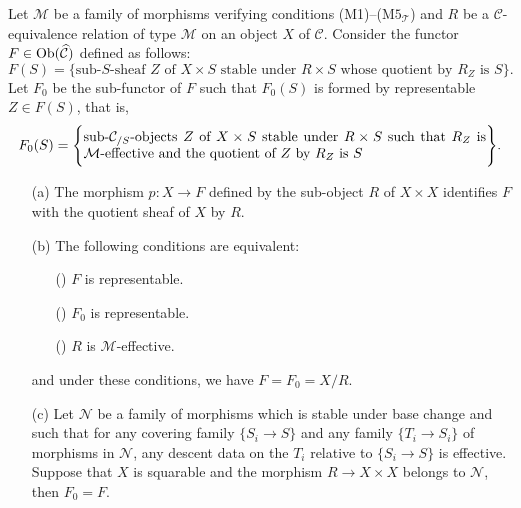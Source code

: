 \begin{theorem}\label{site sheaf quotient by M-effective char}
Let $\mathcal{M}$ be a family of morphisms verifying conditions (M1)--($\text{M5}_\mathcal{T}$) and $R$ be a $\mathcal{C}$-equivalence relation of type $\mathcal{M}$ on an object $X$ of $\mathcal{C}$. Consider the functor $F\in\mathrm{Ob}(\widehat{\mathcal{C}})$ defined as follows:
\[F(S)=\{\text{sub-$S$-sheaf $Z$ of $X\times S$ stable under $R\times S$ whose quotient by $R_Z$ is $S$}\}.\]
Let $F_0$ be the sub-functor of $F$ such that $F_0(S)$ is formed by representable $Z\in F(S)$, that is,
\[F_0(S)=\Bigg\{\parbox{4in}{%
sub-$\mathcal{C}_{/S}$-objects $Z$ of $X\times S$ stable under $R\times S$ such that $R_Z$ is $\mathcal{M}$-effective and the quotient of $Z$ by $R_Z$ is $S$%
}\Bigg\}.\]
\begin{enumerate}
    \item[(a)] The morphism $p:X\to F$ defined by the sub-object $R$ of $X\times X$ identifies $F$ with the quotient sheaf of $X$ by $R$.
    \item[(b)] The following conditions are equivalent:
    \begin{enumerate}
        \item[(\rmnum{1})] $F$ is representable.
        \item[(\rmnum{2})] $F_0$ is representable.
        \item[(\rmnum{3})] $R$ is $\mathcal{M}$-effective.
    \end{enumerate}
    and under these conditions, we have $F=F_0=X/R$.
    \item[(c)] Let $\mathcal{N}$ be a family of morphisms which is stable under base change and such that for any covering family $\{S_i\to S\}$ and any family $\{T_i\to S_i\}$ of morphisms in $\mathcal{N}$, any descent data on the $T_i$ relative to $\{S_i\to S\}$ is effective. Suppose that $X$ is squarable and the morphism $R\to X\times X$ belongs to $\mathcal{N}$, then $F_0=F$.
\end{enumerate}
\end{theorem}

